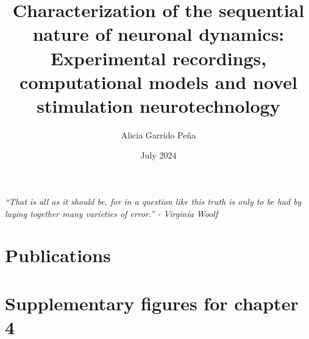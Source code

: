 \documentclass[11pt,a4paper,twoside]{book} %
\title{Characterization of the sequential nature of neuronal dynamics: Experimental recordings, computational models and novel stimulation neurotechnology}
\author{Alicia Garrido Peña}
\date{July 2024}
\numberwithin{equation}{section}
\begin{document}
 \maketitle

 \newpage
 \clearpage
 \newpage
 
 \newpage
 \clearpage
 \vfill
 {\centering \large \textit{``That is all as it should be, for in a question like this truth is only to be had by laying together many
 		varieties of error.'' - Virginia Woolf}\par}

 \vfill
 
 


 \tableofcontents
 \listoftables
 \listoffigures

 \newpage



\resetpagenumbering

 
 
 
 

 
 
 


\printbibliography


\begin{appendix}
\chapter{Publications}

\begin{refsection}
\nocite{*}

\printbibliography[heading={subbibliography},title={Journal Publications},keyword=journal]

\printbibliography[heading={subbibliography},title={International Conference Contributions},keyword=conference]

\end{refsection}

\chapter{Supplementary figures for chapter 4}



%
% 


\end{appendix}
\end{document}
